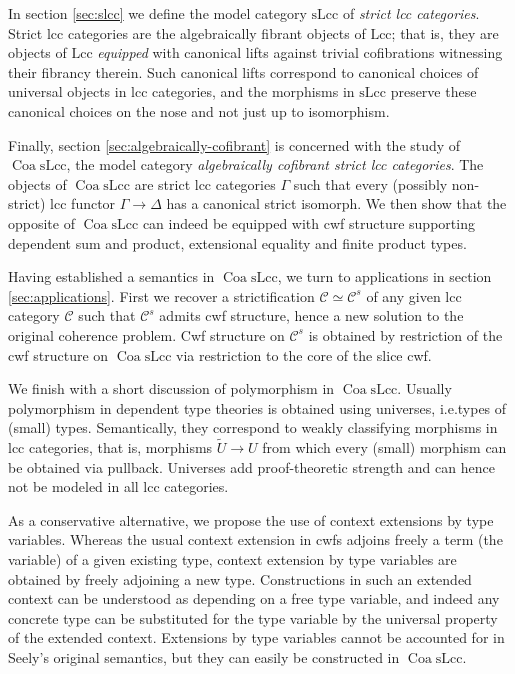 \documentclass[a4paper]{article}
\theoremstyle{remark}
\theoremstyle{definition}
\begin{document}
In section \ref{sec:slcc} we define the model category $\mathrm{sLcc}$ of \emph{strict lcc categories}.
Strict lcc categories are the algebraically fibrant objects of $\mathrm{Lcc}$; that is, they are objects of $\mathrm{Lcc}$ \emph{equipped} with canonical lifts against trivial cofibrations witnessing their fibrancy therein.
Such canonical lifts correspond to canonical choices of universal objects in lcc categories, and the morphisms in $\mathrm{sLcc}$ preserve these canonical choices on the nose and not just up to isomorphism.

Finally, section \ref{sec:algebraically-cofibrant} is concerned with the study of $\operatorname{Coa} \mathrm{sLcc}$, the model category \emph{algebraically cofibrant strict lcc categories}.
The objects of $\operatorname{Coa} \mathrm{sLcc}$ are strict lcc categories $\Gamma$ such that every (possibly non-strict) lcc functor $\Gamma \rightarrow \Delta$ has a canonical strict isomorph.
We then show that the opposite of $\operatorname{Coa} \mathrm{sLcc}$ can indeed be equipped with cwf structure supporting dependent sum and product, extensional equality and finite product types.

Having established a semantics in $\operatorname{Coa} \mathrm{sLcc}$, we turn to applications in section \ref{sec:applications}.
First we recover a strictification $\mathcal{C} \simeq \mathcal{C}^s$ of any given lcc category $\mathcal{C}$ such that $\mathcal{C}^s$ admits cwf structure, hence a new solution to the original coherence problem.
Cwf structure on $\mathcal{C}^s$ is obtained by restriction of the cwf structure on $\operatorname{Coa} \mathrm{sLcc}$ via restriction to the core of the slice cwf.

We finish with a short discussion of polymorphism in $\operatorname{Coa} \mathrm{sLcc}$.
Usually polymorphism in dependent type theories is obtained using universes, i.e.\@ types of (small) types.
Semantically, they correspond to weakly classifying morphisms in lcc categories, that is, morphisms $\tilde U \rightarrow U$ from which every (small) morphism can be obtained via pullback.
Universes add proof-theoretic strength and can hence not be modeled in all lcc categories.

As a conservative alternative, we propose the use of context extensions by type variables.
Whereas the usual context extension in cwfs adjoins freely a term (the variable) of a given existing type, context extension by type variables are obtained by freely adjoining a new type.
Constructions in such an extended context can be understood as depending on a free type variable, and indeed any concrete type can be substituted for the type variable by the universal property of the extended context.
Extensions by type variables cannot be accounted for in Seely's original semantics, but they can easily be constructed in $\operatorname{Coa} \mathrm{sLcc}$.
\end{document}
